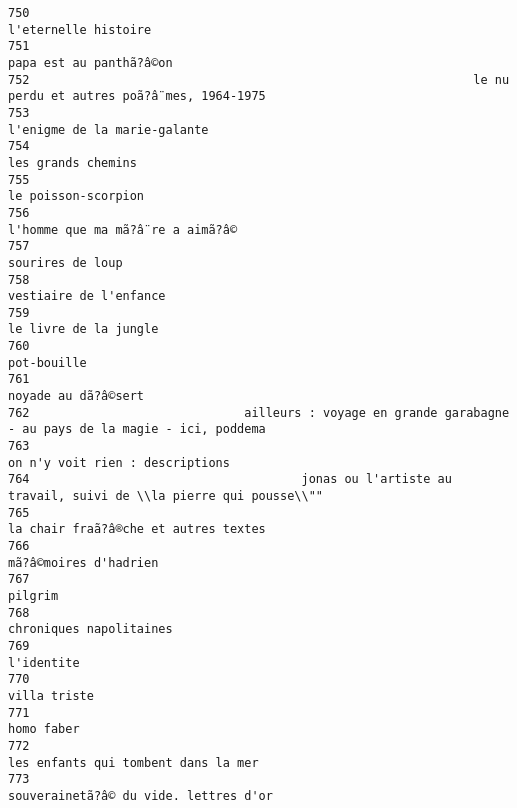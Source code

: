 \documentclass[
]{report}
\begin{document}
\begin{verbatim}
750                                                                                    l'eternelle histoire
751                                                                                 papa est au panthã?â©on
752                                                              le nu perdu et autres poã?â¨mes, 1964-1975
753                                                                            l'enigme de la marie-galante
754                                                                                      les grands chemins
755                                                                                     le poisson-scorpion
756                                                                        l'homme que ma mã?â¨re a aimã?â©
757                                                                                        sourires de loup
758                                                                                  vestiaire de l'enfance
759                                                                                   le livre de la jungle
760                                                                                             pot-bouille
761                                                                                     noyade au dã?â©sert
762                              ailleurs : voyage en grande garabagne - au pays de la magie - ici, poddema
763                                                                         on n'y voit rien : descriptions
764                                      jonas ou l'artiste au travail, suivi de \\la pierre qui pousse\\""
765                                                                    la chair fraã?â®che et autres textes
766                                                                                   mã?â©moires d'hadrien
767                                                                                                 pilgrim
768                                                                                 chroniques napolitaines
769                                                                                              l'identite
770                                                                                            villa triste
771                                                                                              homo faber
772                                                                     les enfants qui tombent dans la mer
773                                                                   souverainetã?â© du vide. lettres d'or

\end{verbatim}
\end{document}
